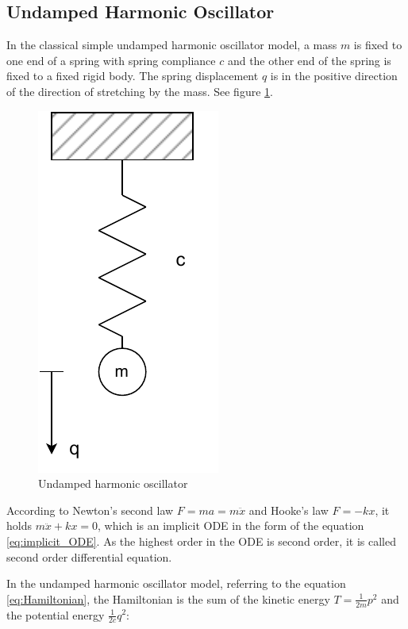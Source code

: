 \documentclass[
	parskip, 			   %
	twoside, 			   %
	DIV=14, 			   %
	BCOR=15.0mm, 		   %
	headsepline, 		   %
	open=right, 		   %
	captions=tableheading, %
	bibliography=totoc,    %
	numbers=noenddot       %
]{scrreprt}
\begin{document}
\subsection{Undamped Harmonic Oscillator}
In the classical simple undamped harmonic oscillator model, a mass $m$ is fixed to one end of a spring with spring compliance $c$ and the other end of the spring is fixed to a fixed rigid body. The spring displacement $q$ is in the positive direction of the direction of stretching by the mass. See figure \ref{fig:physical_model_undamped_harmonic_oscillator}.

\clearpage
\begin{figure}[h!]
    \centering
    \includegraphics[scale=1]{figures/undamped harmonic oscillator.pdf}
    \caption{Undamped harmonic oscillator}
    \label{fig:physical_model_undamped_harmonic_oscillator}
\end{figure}

According to Newton's second law $F=ma=m\ddot{x}$ and Hooke's law $F=-kx$, it holds $m\ddot{x}+kx=0$, which is an implicit ODE in the form of the equation \ref{eq:implicit_ODE}. As the highest order in the ODE is second order, it is called second order differential equation.

In the undamped harmonic oscillator model, referring to the equation \ref{eq:Hamiltonian}, the Hamiltonian is the sum of the kinetic energy $T=\frac{1}{2m}p^2$ and the potential energy $\frac{1}{2c}q^2$:
\end{document}
